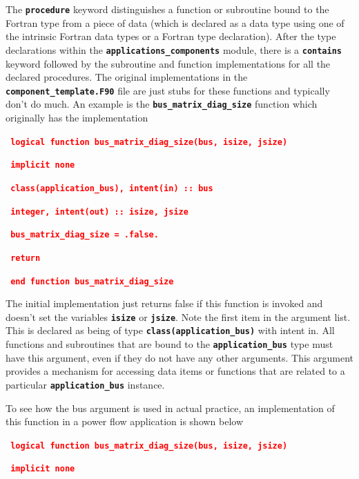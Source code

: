 \documentclass[12pt]{report} %
\begin{document}
The \texttt{\textbf{procedure}} keyword distinguishes a function or subroutine bound to the Fortran type from a piece of data (which is declared as a data type using one of the intrinsic Fortran data types or a Fortran type declaration).
After the type declarations within the \texttt{\textbf{applications\_components}} module, there is a \texttt{\textbf{contains}} keyword followed by the subroutine and function implementations for all the declared procedures. The original implementations in the \texttt{\textbf{component\_template.F90}} file are just stubs for these functions and typically don't do much. An example is the \texttt{\textbf{bus\_matrix\_diag\_size}} function which originally has the implementation

\textcolor{red}{\texttt{\textbf{  logical function bus\_matrix\_diag\_size(bus, isize, jsize)}}}

\textcolor{red}{\texttt{\textbf{    implicit none}}}

\textcolor{red}{\texttt{\textbf{    class(application\_bus), intent(in) :: bus}}}

\textcolor{red}{\texttt{\textbf{    integer, intent(out) :: isize, jsize}}}

\textcolor{red}{\texttt{\textbf{    bus\_matrix\_diag\_size = .false.}}}

\textcolor{red}{\texttt{\textbf{    return}}}

\textcolor{red}{\texttt{\textbf{  end function bus\_matrix\_diag\_size}}}

The initial implementation just returns false if this function is invoked and doesn't set the variables \texttt{\textbf{isize}} or \texttt{\textbf{jsize}}. Note the first item in the argument list. This is declared as being of type \texttt{\textbf{class(application\_bus)}} with intent in. All functions and subroutines that are bound to the \texttt{\textbf{application\_bus}} type must have this argument, even if they do not have any other arguments. This argument provides a mechanism for accessing data items or functions that are related to a particular \texttt{\textbf{application\_bus}} instance.

To see how the bus argument is used in actual practice, an implementation of this function in a power flow application is shown below

\textcolor{red}{\texttt{\textbf{  logical function bus\_matrix\_diag\_size(bus, isize, jsize)}}}

\textcolor{red}{\texttt{\textbf{    implicit none}}}
\end{document}

